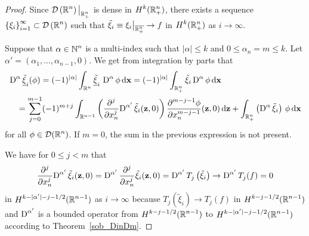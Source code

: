 \begin{proof}
Since $\displaystyle \DD\left(\RR^n\right)\big|_{\RR^n_+}$ is dense in
$\displaystyle H^k(\RR^n_+)$, there exists a sequence
$\displaystyle \left\{\xi_i\right\}_{i=1}^\infty \subset
\DD\left(\RR^n\right)$ such that
$\displaystyle \tilde{\xi}_i \equiv \xi_i\big|_{\overline{\RR^n_+}} \to f$ in
$\displaystyle H^k(\RR^n_+)$ as $i \to \infty$.

Suppose that $\displaystyle \alpha \in \NN^n$ is a multi-index such
that $|\alpha| \leq k$ and $0 \leq \alpha_n = m \leq k$.  Let
$\alpha' = (\alpha_1, \ldots, \alpha_{n-1},0)$.  We get from
integration by parts that
\begin{align}
&\diff^\alpha \underline{\tilde{\xi}}_i(\phi)
= (-1)^{|\alpha|} \int_{\RR^n}
\underline{\tilde{\xi}}_i\, \diff^\alpha \phi \dx{\VEC{x}}
= (-1)^{|\alpha|} \int_{\RR^n_+} \tilde{\xi}_i \diff^\alpha \phi \dx{\VEC{x}}
\nonumber \\
&\quad = \sum_{j=0}^{m-1} (-1)^{m+j} \int_{\RR^{n-1}}
\left( \pdfdxn{\diff^{\alpha'} \tilde{\xi}_i}{x_n}{j}(\VEC{z},0) \right)
\pdydxn{\phi}{x_n}{m-j-1}(\VEC{z},0) 
\dx{\VEC{z}} + \int_{\RR^n_+} \left(\diff^\alpha \tilde{\xi}_i\right)\,
\phi \dx{\VEC{x}}   \label{H0TraceEq1}
\end{align}
for all $\displaystyle \phi \in \DD(\RR^n)$.  If $m=0$, the sum in the previous
expression is not present.

We have for $0 \leq j <m$ that
\[
\pdfdxn{\diff^{\alpha'} \tilde{\xi}_i}{x_n}{j}(\VEC{z},0)
= \diff^{\alpha'} \pdfdxn{\tilde{\xi}_i}{x_n}{j}(\VEC{z},0)
= \diff^{\alpha'}  T_j\left( \tilde{\xi}_i \right) \to 
\diff^{\alpha'}  T_j(f) = 0
\]
in $\displaystyle H^{k-|\alpha'|-j -1/2}(\RR^{n-1})$ as $i \to \infty$
because
$\displaystyle T_j\left( \tilde{\xi}_i \right) \to  T_j(f)$ in
$\displaystyle H^{k-j -1/2}(\RR^{n-1})$ and
$\displaystyle \diff^{\alpha'}$ is a bounded operator from
$\displaystyle H^{k-j -1/2}(\RR^{n-1})$ to
$\displaystyle H^{k-|\alpha'|-j -1/2}(\RR^{n-1})$ according to 
Theorem~\ref{sob_DinDm}.


\end{proof}
